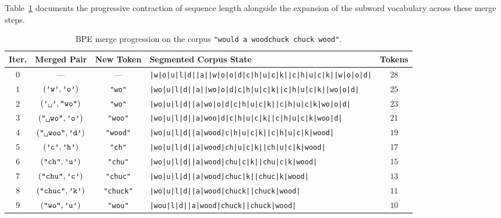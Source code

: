 \documentclass[../../main.tex]{subfiles}
\begin{document}
Table~\ref{tab:bpe_merge_progression} documents the progressive contraction of sequence length alongside the expansion of the subword vocabulary across these merge steps.

\begin{table}[htbp]
\centering
\small
\caption{BPE merge progression on the corpus \texttt{"would a woodchuck chuck wood"}.}
\label{tab:bpe_merge_progression}
\begin{tabularx}{\textwidth}{c c c X c}
\toprule
\textbf{Iter.} & \textbf{Merged Pair} & \textbf{New Token} & \textbf{Segmented Corpus State} & \textbf{Tokens} \\
\midrule
$0$ & --- & --- & \texttt{|w|o|u|l|d|\textvisiblespace{}|a|\textvisiblespace{}|w|o|o|d|c|h|u|c|k|\textvisiblespace{}|c|h|u|c|k|\textvisiblespace{}|w|o|o|d|} & $28$ \\
$1$ & $(\text{\texttt{'w'}}, \text{\texttt{'o'}})$ & \texttt{"wo"} & \texttt{|wo|u|l|d|\textvisiblespace{}|a|\textvisiblespace{}|wo|o|d|c|h|u|c|k|\textvisiblespace{}|c|h|u|c|k|\textvisiblespace{}|wo|o|d|} & $25$ \\
$2$ & $(\text{\texttt{'\textvisiblespace{}'}}, \text{\texttt{"wo"}})$ & \texttt{"\textvisiblespace{}wo"} & \texttt{|wo|u|l|d|\textvisiblespace{}|a|\textvisiblespace{}wo|o|d|c|h|u|c|k|\textvisiblespace{}|c|h|u|c|k|\textvisiblespace{}wo|o|d|} & $23$ \\
$3$ & $(\text{\texttt{"\textvisiblespace{}wo"}}, \text{\texttt{'o'}})$ & \texttt{"\textvisiblespace{}woo"} & \texttt{|wo|u|l|d|\textvisiblespace{}|a|\textvisiblespace{}woo|d|c|h|u|c|k|\textvisiblespace{}|c|h|u|c|k|\textvisiblespace{}woo|d|} & $21$ \\
$4$ & $(\text{\texttt{"\textvisiblespace{}woo"}}, \text{\texttt{'d'}})$ & \texttt{"\textvisiblespace{}wood"} & \texttt{|wo|u|l|d|\textvisiblespace{}|a|\textvisiblespace{}wood|c|h|u|c|k|\textvisiblespace{}|c|h|u|c|k|\textvisiblespace{}wood|} & $19$ \\
$5$ & $(\text{\texttt{'c'}}, \text{\texttt{'h'}})$ & \texttt{"ch"} & \texttt{|wo|u|l|d|\textvisiblespace{}|a|\textvisiblespace{}wood|ch|u|c|k|\textvisiblespace{}|ch|u|c|k|\textvisiblespace{}wood|} & $17$ \\
$6$ & $(\text{\texttt{"ch"}}, \text{\texttt{'u'}})$ & \texttt{"chu"} & \texttt{|wo|u|l|d|\textvisiblespace{}|a|\textvisiblespace{}wood|chu|c|k|\textvisiblespace{}|chu|c|k|\textvisiblespace{}wood|} & $15$ \\
$7$ & $(\text{\texttt{"chu"}}, \text{\texttt{'c'}})$ & \texttt{"chuc"} & \texttt{|wo|u|l|d|\textvisiblespace{}|a|\textvisiblespace{}wood|chuc|k|\textvisiblespace{}|chuc|k|\textvisiblespace{}wood|} & $13$ \\
$8$ & $(\text{\texttt{"chuc"}}, \text{\texttt{'k'}})$ & \texttt{"chuck"} & \texttt{|wo|u|l|d|\textvisiblespace{}|a|\textvisiblespace{}wood|chuck|\textvisiblespace{}|chuck|\textvisiblespace{}wood|} & $11$ \\
$9$ & $(\text{\texttt{"wo"}}, \text{\texttt{'u'}})$ & \texttt{"wou"} & \texttt{|wou|l|d|\textvisiblespace{}|a|\textvisiblespace{}wood|chuck|\textvisiblespace{}|chuck|\textvisiblespace{}wood|} & $10$ \\
\bottomrule
\end{tabularx}
\end{table}
\end{document}
